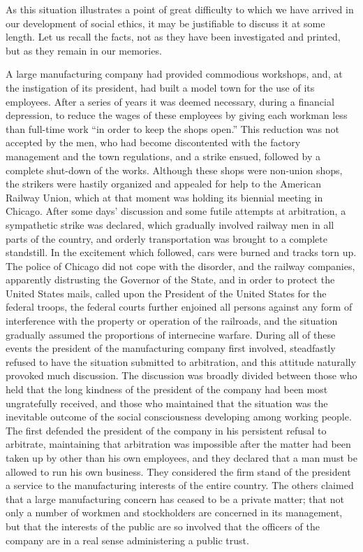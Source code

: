 \documentclass[]{article}
\begin{document}
\begin{sectionbody}
\addamsparagraph As this situation illustrates a point of great difficulty to which we
have arrived in our development of social ethics, it may be justifiable
to discuss it at some length. Let us recall the facts, not as they have
been investigated and printed, but as they remain in our memories.

\addamsparagraph A large manufacturing company had provided commodious workshops, and, at
the instigation of its president, had built a model town for the use of
its employees. After a series of years it was deemed necessary, during a
financial depression, to reduce the wages of these employees by giving
each workman less than full-time work ``in order to keep the shops open.''
This reduction was not accepted by the men, who had become discontented
with the factory management and the town regulations, and a strike
ensued, followed by a complete shut-down of the works. Although these
shops were non-union shops, the strikers were hastily organized and
appealed for help to the American Railway Union, which at that moment
was holding its biennial meeting in Chicago. After some days' discussion
and some futile attempts at arbitration, a sympathetic strike was
declared, which gradually involved railway men in all parts of the
country, and orderly transportation was brought to a complete
standstill. In the excitement which followed, cars were burned and
tracks torn up. The police of Chicago did not cope with the disorder,
and the railway companies, apparently distrusting the Governor of the
State, and in order to protect the United States mails, called upon the
President of the United States for the federal troops, the federal
courts further enjoined all persons against any form of interference
with the property or operation of the railroads, and the situation
gradually assumed the proportions of internecine warfare. During all of
these events the president of the manufacturing company first involved,
steadfastly refused to have the situation submitted to arbitration, and
this attitude naturally provoked much discussion. The discussion was
broadly divided between those who held that the long kindness of the
president of the company had been most ungratefully received, and those
who maintained that the situation was the inevitable outcome of the
social consciousness developing among working people. The first defended
the president of the company in his persistent refusal to arbitrate,
maintaining that arbitration was impossible after the matter had been
taken up by other than his own employees, and they declared that a man
must be allowed to run his own business. They considered the firm stand
of the president a service to the manufacturing interests of the entire
country. The others claimed that a large manufacturing concern has
ceased to be a private matter; that not only a number of workmen and
stockholders are concerned in its management, but that the interests of
the public are so involved that the officers of the company are in a
real sense administering a public trust.


\end{sectionbody}
\end{document}
